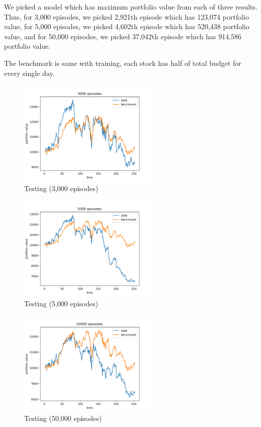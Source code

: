 We picked a model which has maximum portfolio value from each of three results. Thus, for 3,000 episodes, we picked 2,921th episode which has 123,074 portfolio value, for 5,000 episodes, we picked 4,602th episode which has 520,438 portfolio value, and for 50,000 episodes, we picked 37,042th episode which has 914,586 portfolio value. 

The benchmark is same with training, each stock has half of total budget for every single day.

\begin{figure}[H]
\begin{center}
\includegraphics[clip, width=0.6\textwidth]{Graphics/image6.png} \caption{Testing (3,000 episodes)}
\end{center}
\end{figure}

\begin{figure}[H]
\begin{center}
\includegraphics[clip, width=0.6\textwidth]{Graphics/image5.png} \caption{Testing (5,000 episodes)}
\end{center}
\end{figure}

\begin{figure}[H]
\begin{center}
\includegraphics[clip, width=0.6\textwidth]{Graphics/image7.png} \caption{Testing (50,000 episodes)}
\end{center}
\end{figure}

